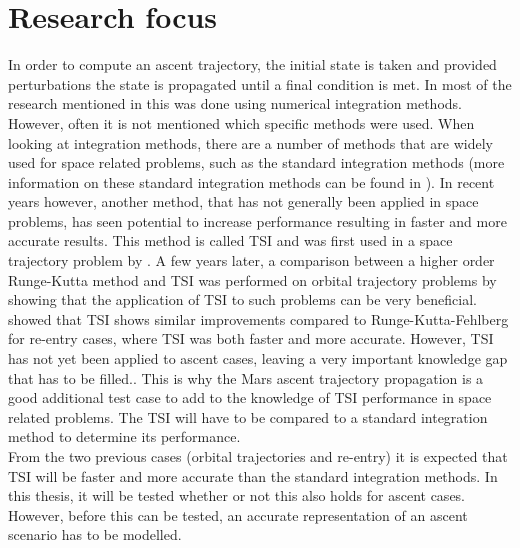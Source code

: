 
\section{Research focus}
\label{sec:researchFocus}
In order to compute an ascent trajectory, the initial state is taken and provided perturbations the state is propagated until a final condition is met. In most of the research mentioned in  this was done using numerical integration methods. However, often it is not mentioned which specific methods were used. When looking at integration methods, there are a number of methods that are widely used for space related problems, such as the standard integration methods (more information on these standard integration methods can be found in ). In recent years however, another method, that has not generally been applied in space problems, has seen potential to increase performance resulting in faster and more accurate results. This method is called \acf{TSI} and was first used in a space trajectory problem by \cite{montenbruck1992numerical}. A few years later, a comparison between a higher order Runge-Kutta method and \ac{TSI} was performed on orbital trajectory problems by \cite{scott2008high} showing that the application of \ac{TSI} to such problems can be very beneficial. \cite{bergsma2016application} showed that \ac{TSI} shows similar improvements compared to Runge-Kutta-Fehlberg for re-entry cases, where \ac{TSI} was both faster and more accurate. However, \ac{TSI} has not yet been applied to ascent cases, leaving a very important knowledge gap that has to be filled.. This is why the Mars ascent trajectory propagation is a good additional test case to add to the knowledge of \ac{TSI} performance in space related problems. The \ac{TSI} will have to be compared to a standard integration method to determine its performance. \\
From the two previous cases (orbital trajectories and re-entry) it is expected that \ac{TSI} will be faster and more accurate than the standard integration methods. In this thesis, it will be tested whether or not this also holds for ascent cases. However, before this can be tested, an accurate representation of an ascent scenario has to be modelled. 
 


